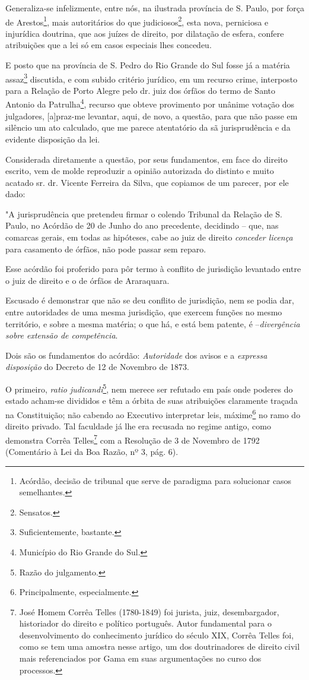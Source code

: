 Generaliza-se infelizmente, entre nós, na ilustrada província de S.
Paulo, por força de Arestos\footnote{Acórdão, decisão de tribunal que
  serve de paradigma para solucionar casos semelhantes.}, mais
autoritários do que judiciosos\footnote{Sensatos.}, esta nova,
perniciosa e injurídica doutrina, que aos juízes de direito, por
dilatação de esfera, confere atribuições que a lei só em casos especiais
lhes concedeu.

E posto que na província de S. Pedro do Rio Grande do Sul fosse já a
matéria assaz\footnote{Suficientemente, bastante.} discutida, e com
subido critério jurídico, em um recurso crime, interposto para a Relação
de Porto Alegre pelo dr. juiz dos órfãos do termo de Santo Antonio da
Patrulha\footnote{Município do Rio Grande do Sul.}, recurso que obteve
provimento por unânime votação dos julgadores, {[}a{]}praz-me levantar,
aqui, de novo, a questão, para que não passe em silêncio um ato
calculado, que me parece atentatório da sã jurisprudência e da evidente
disposição da lei.

Considerada diretamente a questão, por seus fundamentos, em face do
direito escrito, vem de molde reproduzir a opinião autorizada do
distinto e muito acatado sr. dr. Vicente Ferreira da Silva, que copiamos
de um parecer, por ele dado:

"A jurisprudência que pretendeu firmar o colendo Tribunal da Relação de
S. Paulo, no Acórdão de 20 de Junho do ano precedente, decidindo -- que,
nas comarcas gerais, em todas as hipóteses, cabe ao juiz de direito
\emph{conceder licença} para casamento de órfãos, não pode passar sem
reparo.

Esse acórdão foi proferido para pôr termo à conflito de jurisdição
levantado entre o juiz de direito e o de órfãos de Araraquara.

Escusado é demonstrar que não se deu conflito de jurisdição, nem se
podia dar, entre autoridades de uma mesma jurisdição, que exercem
funções no mesmo território, e sobre a mesma matéria; o que há, e está
bem patente, é --\emph{divergência sobre extensão de competência}.

Dois são os fundamentos do acórdão: \emph{Autoridade} dos avisos e a
\emph{expressa disposição} do Decreto de 12 de Novembro de 1873.

O primeiro, \emph{ratio judicandi}\footnote{Razão do julgamento.}, nem
merece ser refutado em país onde poderes do estado acham-se divididos e
têm a órbita de suas atribuições claramente traçada na Constituição; não
cabendo ao Executivo interpretar leis, máxime\footnote{Principalmente,
  especialmente.} no ramo do direito privado. Tal faculdade já lhe era
recusada no regime antigo, como demonstra Corrêa Telles\footnote{José
  Homem Corrêa Telles (1780-1849) foi jurista, juiz, desembargador,
  historiador do direito e político português. Autor fundamental para o
  desenvolvimento do conhecimento jurídico do século XIX, Corrêa Telles
  foi, como se tem uma amostra nesse artigo, um dos doutrinadores de
  direito civil mais referenciados por Gama em suas argumentações no
  curso dos processos.} com a Resolução de 3 de Novembro de 1792
(Comentário à Lei da Boa Razão, nº 3, pág. 6).

